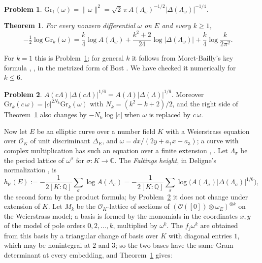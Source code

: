 \documentclass[reqno]{amsart}
\theoremstyle{definition}
\newtheorem{problem}{Problem}[section]
\theoremstyle{plain}
\newtheorem{theorem}{Theorem}[section]
\newcommand{\Q}{\mathbb{Q}}
\newcommand{\C}{\mathbb{C}}
\newcommand{\Oc}{\mathcal{O}}
\newcommand{\hF}{h_{\mathrm{F}}}
\begin{document}
\begin{problem}\label{pr:norm-k1}
\(\mathrm{Gr}_1(\omega) = \lVert \omega \rVert^2 = \sqrt2\,\pi\, A(\Lambda_\omega)^{-1/2} \lvert \Delta(\Lambda_\omega) \rvert^{-1/4}\).
\end{problem}

\begin{theorem}\label{thm:Gk}
For every nonzero differential \(\omega\) on \(E\) and every \(k \ge 1\),
\[
  -\tfrac12 \log \mathrm{Gr}_k(\omega) = \frac{k}{4}\log A(\Lambda_\omega) + \frac{k^2 + 2}{24} \log\lvert \Delta(\Lambda_\omega) \rvert + \frac{k}{4}\log\frac{k}{2\pi^2} .
\]
\end{theorem}

For \(k = 1\) this is Problem~\ref{pr:norm-k1}; for general \(k\) it follows from Moret-Bailly's key formula \cite[Ch.~VIII]{MB85}, \cite{MB90}, in the metrized form of Bost \cite[Thm.~4.10(v)]{Bo96}.  We have checked it numerically for \(k \le 6\).

\begin{problem}\label{pr:homog}
\(A(c\Lambda) \lvert \Delta(c\Lambda) \rvert^{1/6} = A(\Lambda) \lvert \Delta(\Lambda) \rvert^{1/6}\).  Moreover \(\mathrm{Gr}_k(c\,\omega) = \lvert c \rvert^{2N_k} \mathrm{Gr}_k(\omega)\) with \(N_k = (k^2 - k + 2)/2\), and the right side of Theorem~\ref{thm:Gk} also changes by \(-N_k\log\lvert c \rvert\) when \(\omega\) is replaced by \(c\,\omega\).
\end{problem}

Now let \(E\) be an elliptic curve over a number field \(K\) with a Weierstrass equation over \(\Oc_K\) of unit discriminant \(\Delta_E\), and \(\omega = dx/(2y + a_1x + a_3)\); a curve with complex multiplication has such an equation over a finite extension \cite{ST68}, \cite[\S VIII.8]{Si1}.  Let \(\Lambda_\sigma\) be the period lattice of \(\omega^\sigma\) for \(\sigma \colon K \to \C\).  The \emph{Faltings height}, in Deligne's normalization \cite{De85}, is
\[
  \hF(E) := -\frac{1}{2[K:\Q]} \sum_\sigma \log A(\Lambda_\sigma) = -\frac{1}{2[K:\Q]} \sum_\sigma \log\bigl(A(\Lambda_\sigma)\lvert\Delta(\Lambda_\sigma)\rvert^{1/6}\bigr),
\]
the second form by the product formula; by Problem~\ref{pr:homog} it does not change under extension of \(K\).  Let \(M_k\) be the \(\Oc_K\)-lattice of sections of \((\Oc([0]) \otimes \omega_E)^{\otimes k}\) on the Weierstrass model; a basis is formed by the monomials in the coordinates \(x, y\) of the model of pole orders \(0, 2, \dots, k\), multiplied by \(\omega^k\).  The \(f_j\omega^k\) are obtained from this basis by a triangular change of basis over \(K\) with diagonal entries \(1\), which may be nonintegral at \(2\) and \(3\); so the two bases have the same Gram determinant at every embedding, and Theorem~\ref{thm:Gk} gives:
\end{document}
